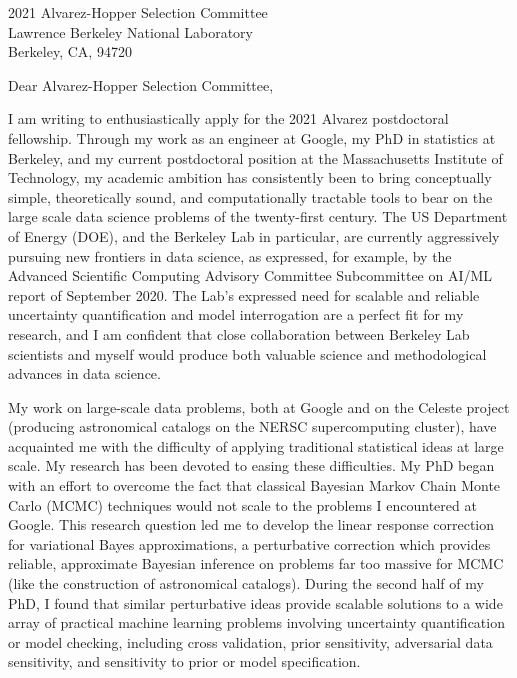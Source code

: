 \documentclass{letter}
\begin{document}
\begin{letter}{2021 Alvarez-Hopper Selection Committee\\
Lawrence Berkeley National Laboratory\\
Berkeley, CA, 94720}


\opening{Dear Alvarez-Hopper Selection Committee,}

I am writing to enthusiastically apply for the 2021 Alvarez postdoctoral
fellowship.  Through my work as an engineer at Google, my PhD in statistics at
Berkeley, and my current postdoctoral position at the Massachusetts Institute of
Technology, my academic ambition has consistently been to bring conceptually
simple, theoretically sound, and computationally tractable tools to bear on the
large scale data science problems of the twenty-first century.  The US
Department of Energy (DOE), and the Berkeley Lab in particular, are currently
aggressively pursuing new frontiers in data science, as expressed, for example,
by the Advanced Scientific Computing Advisory Committee Subcommittee on AI/ML
report of September 2020.  The Lab's expressed need for scalable and reliable
uncertainty quantification and model interrogation are a perfect fit for my
research, and I am confident that close collaboration between Berkeley
Lab scientists and myself would produce both valuable science and
methodological advances in data science.

My work on large-scale data problems, both at Google and on the Celeste project
(producing astronomical catalogs on the NERSC supercomputing cluster), have
acquainted me with the difficulty of applying traditional statistical ideas at
large scale.  My research has been devoted to easing these difficulties. My PhD
began with an effort to overcome the fact that classical Bayesian Markov Chain
Monte Carlo (MCMC) techniques would not scale to the problems I encountered at
Google. This research question led me to develop the linear response correction
for variational Bayes approximations, a perturbative correction which provides
reliable, approximate Bayesian inference on problems far too massive for MCMC
(like the construction of astronomical catalogs). During the second half of my
PhD, I found that similar perturbative ideas provide scalable solutions to a
wide array of practical machine learning problems involving uncertainty
quantification or model checking, including cross validation, prior sensitivity,
adversarial data sensitivity, and sensitivity to prior or model specification.


\end{letter}
\end{document}
